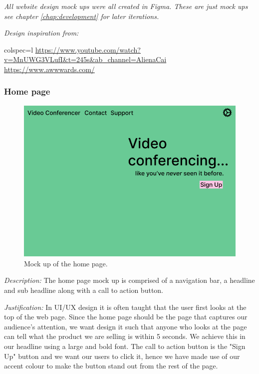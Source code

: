 \textit{All website design mock ups were all created in
Figma. These are just mock ups see chapter \ref{chap:development}
for later iterations.}\\ \vspace{0.1cm}

\textit{Design inspiration from:}\\

\begin{tblr}{colspec={l}}
  \url{https://www.youtube.com/watch?v=MnUWG3VLufI&t=245s&ab_channel=AlienaCai}\\
  \url{https://www.awwwards.com/}\\
\end{tblr}

\subsubsection{Home page}

\begin{figure}[H]
\centering

\includegraphics[scale=0.2]{Images/HomeUI_1.png}

\caption{Mock up of the home page.}
\label{fig:ui1}
\end{figure}

\textit{Description:}
The home page mock up is comprised of a navigation bar, a
headline and sub headline along with a call to action button.
\\ \vspace{0.2cm}

\textit{Justification:}
In UI/UX design it is often taught that the user first looks
at the top of the web page. Since the home page should be the
page that captures our audience's attention, we want design
it such that anyone who looks at the page can tell what the
product we are selling is within 5 seconds. We achieve this
in our headline using a large and bold font. The call to
action button is the "Sign Up" button and we want our users
to click it, hence we have made use of our accent colour to
make the button stand out from the rest of the page.\\
\vspace{0.2cm}


